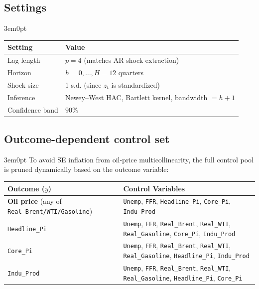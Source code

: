 \documentclass[12pt]{article}
\newenvironment{bodyL2}{\begin{adjustwidth}{3em}{0pt}}{\end{adjustwidth}}
\begin{document}
\subsection{Settings}
\begin{bodyL2}
\begin{center}
\renewcommand{\arraystretch}{1.15}
\begin{tabular}{ll}
\toprule
Setting & Value \\
\midrule
Lag length      & $p = 4$ (matches AR shock extraction) \\
Horizon         & $h = 0, \ldots, H = 12$ quarters \\
Shock size      & 1 s.d. (since $z_t$ is standardized) \\
Inference       & Newey--West HAC, Bartlett kernel, bandwidth $= h + 1$ \\
Confidence band & $90\%$ \\
\bottomrule
\end{tabular}
\end{center}
\end{bodyL2}

\subsection{Outcome-dependent control set}
\begin{bodyL2}
To avoid SE inflation from oil-price multicollinearity, the full control pool is pruned dynamically based on the outcome variable:

\begin{center}
\renewcommand{\arraystretch}{1.3}
\small
\begin{tabular}{p{2.5in} p{3.5in}}
\toprule
Outcome ($y$) & Control Variables \\
\midrule
\textbf{Oil price} \newline (any of \texttt{Real\_Brent/WTI/Gasoline})
  & \texttt{Unemp}, \texttt{FFR}, \texttt{Headline\_Pi}, \texttt{Core\_Pi}, \texttt{Indu\_Prod} \\
\midrule
\texttt{Headline\_Pi}
  & \texttt{Unemp}, \texttt{FFR}, \texttt{Real\_Brent}, \texttt{Real\_WTI}, \texttt{Real\_Gasoline}, \texttt{Core\_Pi}, \texttt{Indu\_Prod} \\
\midrule
\texttt{Core\_Pi}
  & \texttt{Unemp}, \texttt{FFR}, \texttt{Real\_Brent}, \texttt{Real\_WTI}, \texttt{Real\_Gasoline}, \texttt{Headline\_Pi}, \texttt{Indu\_Prod} \\
\midrule
\texttt{Indu\_Prod}
  & \texttt{Unemp}, \texttt{FFR}, \texttt{Real\_Brent}, \texttt{Real\_WTI}, \texttt{Real\_Gasoline}, \texttt{Headline\_Pi}, \texttt{Core\_Pi} \\
\bottomrule
\end{tabular}
\end{center}
\end{bodyL2}
\end{document}
